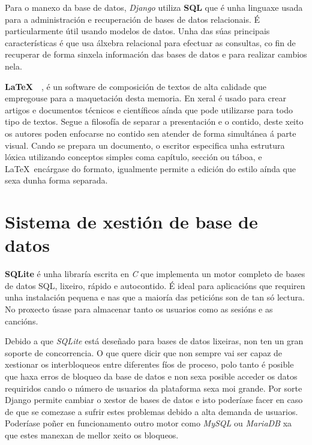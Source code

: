 Para o manexo da base de datos, \textit{Django} utiliza \textbf{SQL} que é unha linguaxe usada para a administración e recuperación de bases de datos relacionais. É particularmente útil usando modelos de datos. Unha das súas principais características é que usa álxebra relacional para efectuar as consultas, co fin de recuperar de forma sinxela información das bases de datos e para realizar cambios nela.

\textbf{\LaTeX}~\cite{latexbook}~\cite{latex}, é un software de composición de textos de alta calidade que empregouse para a maquetación desta memoria. En xeral é usado para crear artigos e documentos técnicos e científicos aínda que pode utilizarse para todo tipo de textos. Segue a filosofía de separar a presentación e o contido, deste xeito os autores poden enfocarse no contido sen atender de forma simultánea á parte visual. Cando se prepara un documento, o escritor especifica unha estrutura lóxica utilizando conceptos simples coma capítulo, sección ou táboa, e \LaTeX~encárgase do formato, igualmente permite a edición do estilo aínda que sexa dunha forma separada.

\section{Sistema de xestión de base de datos}
\textbf{\gls{SQLite}} é unha libraría escrita en \textit{C} que implementa un motor completo de bases de datos SQL, lixeiro, rápido e autocontido. É ideal para aplicacións que requiren unha instalación pequena e nas que a maioría das peticións son de tan só lectura.  No proxecto úsase para almacenar tanto os usuarios como as sesións e as cancións.

Debido a que \textit{SQLite} está deseñado para bases de datos lixeiras, non ten un gran soporte de concorrencia. O que quere dicir que non sempre vai ser capaz de xestionar os interbloqueos entre diferentes fíos de proceso, polo tanto é posible que haxa erros de bloqueo da base de datos e non sexa posible acceder os datos requiridos cando o número de usuarios da plataforma sexa moi grande. Por sorte Django permite cambiar o xestor de bases de datos e isto poderíase facer en caso de que se comezase a sufrir estes problemas debido a alta demanda de usuarios. Poderíase poñer en funcionamento outro motor como \textit{MySQL} ou \textit{MariaDB} xa que estes manexan de mellor xeito os bloqueos.

